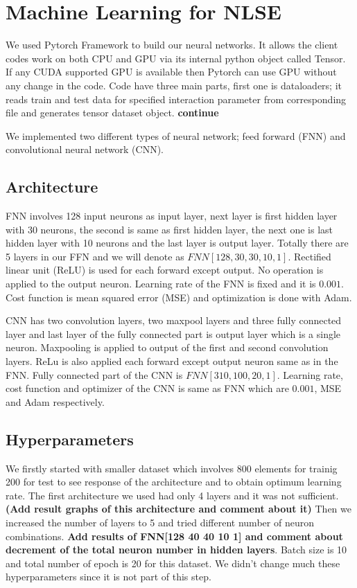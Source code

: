 \documentclass[a4paper,times,12pt]{article}
\begin{document}
\section{Machine Learning for NLSE}

We used Pytorch Framework to build our neural networks. It allows the client codes work on both CPU and GPU via its internal python object called Tensor. If any CUDA supported GPU is available then Pytorch can use GPU without any change in the code. Code have three main parts, first one is dataloaders; it reads train and test data for specified interaction parameter from corresponding file and generates tensor dataset object. \textbf{continue}


We implemented two different types of neural network; feed forward (FNN) and convolutional neural network (CNN).


\subsection{Architecture}

FNN involves 128 input neurons as input layer, next layer is first hidden layer with 30 neurons, the second is same as first hidden layer, the next one is last hidden layer with 10 neurons and the last layer is output layer. Totally there are 5 layers in our FFN and we will denote as $FNN[128, 30, 30, 10, 1]$. Rectified linear unit (ReLU) is used for each forward except output. No operation is applied to the output neuron. Learning rate of the FNN is fixed and it is $0.001$. Cost function is mean squared error (MSE) and optimization is done with Adam. 


CNN has two convolution layers, two maxpool layers and three fully connected layer and last layer of the fully connected part is output layer which is a single neuron. Maxpooling is applied to output of the first and second convolution layers. ReLu is also applied each forward except output neuron same as in the FNN. Fully connected part of the CNN is $FNN[310, 100, 20, 1]$. Learning rate, cost function and optimizer of the CNN is same as FNN which are $0.001$, MSE and Adam respectively.


\subsection{Hyperparameters}

We firstly started with smaller dataset which involves 800 elements for trainig 200 for test to see response of the architecture and to obtain optimum learning rate. The first architecture we used had only 4 layers and it was not sufficient. \textbf{(Add result graphs of this architecture and comment about it)} Then we increased the number of layers to 5 and tried different number of neuron combinations. \textbf{Add results of FNN[128 40 40 10 1] and comment about decrement of the total neuron number in hidden layers}.  Batch size is 10 and total number of epoch is 20 for this dataset. We didn't change much these hyperparameters since it is not part of this step. 
\end{document}
